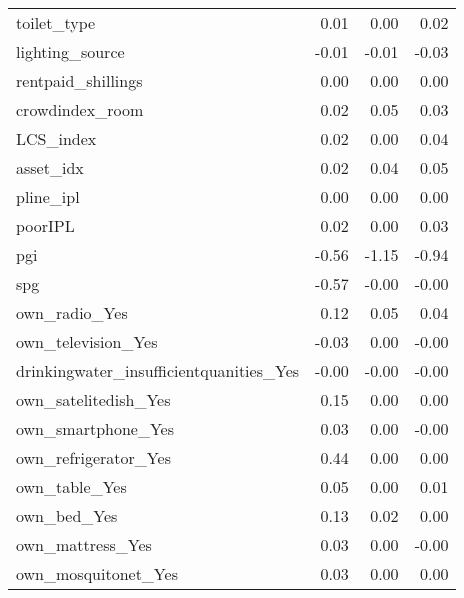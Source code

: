 \begin{longtable}{lrrr}
toilet\_type &                0.01 &                0.00 &                      0.02 \\
lighting\_source &               -0.01 &               -0.01 &                     -0.03 \\
rentpaid\_shillings &                0.00 &                0.00 &                      0.00 \\
crowdindex\_room &                0.02 &                0.05 &                      0.03 \\
LCS\_index &                0.02 &                0.00 &                      0.04 \\
asset\_idx &                0.02 &                0.04 &                      0.05 \\
pline\_ipl &                0.00 &                0.00 &                      0.00 \\
poorIPL &                0.02 &                0.00 &                      0.03 \\
pgi &               -0.56 &               -1.15 &                     -0.94 \\
spg &               -0.57 &               -0.00 &                     -0.00 \\
own\_radio\_Yes &                0.12 &                0.05 &                      0.04 \\
own\_television\_Yes &               -0.03 &                0.00 &                     -0.00 \\
drinkingwater\_insufficientquanities\_Yes &               -0.00 &               -0.00 &                     -0.00 \\
own\_satelitedish\_Yes &                0.15 &                0.00 &                      0.00 \\
own\_smartphone\_Yes &                0.03 &                0.00 &                     -0.00 \\
own\_refrigerator\_Yes &                0.44 &                0.00 &                      0.00 \\
own\_table\_Yes &                0.05 &                0.00 &                      0.01 \\
own\_bed\_Yes &                0.13 &                0.02 &                      0.00 \\
own\_mattress\_Yes &                0.03 &                0.00 &                     -0.00 \\
own\_mosquitonet\_Yes &                0.03 &                0.00 &                      0.00 \\

\end{longtable}
